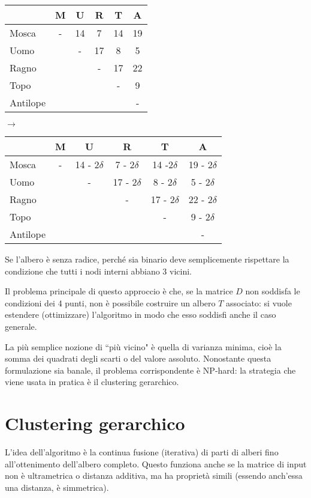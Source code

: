 \begin{minipage}[t]{0.45 \textwidth}
	\begin{tabular}{l | *{5}{c}}
		~ 		& M & U & R & T & A \\
		\hline
		Mosca	& - & 14 & 7 & 14 & 19 \\
		Uomo	& ~ & - & 17 & 8 & 5 \\
		Ragno	& ~ & ~ & - & 17 & 22 \\
		Topo	& ~ & ~ & ~ & - & 9 \\
		Antilope & ~ & ~ & ~ & ~ & -
	\end{tabular}
\end{minipage}
$\rightarrow$
\begin{minipage}[t]{0.55 \textwidth}
	\begin{tabular}{l | *{5}{c}}
		~ 		& M & U & R & T & A \\
		\hline
		Mosca	& - & 14 - 2$\delta$ & 7 - 2$\delta$ & 14 -2$\delta$ & 19 - 2$\delta$ \\
		Uomo	& ~ & - & 17 - 2$\delta$ & 8 - 2$\delta$ & 5 - 2$\delta$ \\
		Ragno	& ~ & ~ & - & 17 - 2$\delta$ & 22 - 2$\delta$ \\
		Topo	& ~ & ~ & ~ & - & 9 - 2$\delta$ \\
		Antilope & ~ & ~ & ~ & ~ & -
	\end{tabular}
\end{minipage}

Se l'albero è senza radice, perché sia binario deve semplicemente rispettare la condizione che tutti i nodi interni abbiano 3 vicini.

Il problema principale di questo approccio è che, se la matrice $D$ non soddisfa le condizioni dei 4 punti, non è possibile costruire un albero $T$ associato: si vuole estendere (ottimizzare) l'algoritmo in modo che esso soddisfi anche il caso generale.

La più semplice nozione di ``più vicino" è quella di varianza minima, cioè la somma dei quadrati degli scarti o del valore assoluto. Nonostante questa formulazione sia banale, il problema corrispondente è NP-hard: la strategia che viene usata in pratica è il clustering gerarchico.

\section{Clustering gerarchico}
L'idea dell'algoritmo è la continua fusione (iterativa) di parti di alberi fino all'ottenimento dell'albero completo. Questo funziona anche se la matrice di input non è ultrametrica o distanza additiva, ma ha proprietà simili (essendo anch'essa una distanza, è simmetrica).

